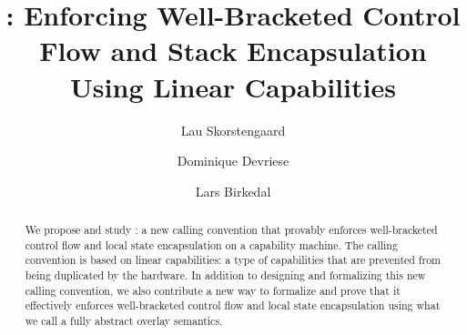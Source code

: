 \documentclass{jfp}
\begin{document}


\totalpg{\pageref{lastpage01}}

\title{\stktokens{}: Enforcing Well-Bracketed Control Flow and Stack Encapsulation Using Linear Capabilities}

\begin{authgrp}
  \author{Lau Skorstengaard}

  \author{Dominique Devriese}

  \author{Lars Birkedal}
\end{authgrp}

\begin{abstract}
  We propose and study \stktokens{}: a new calling convention that provably enforces well-bracketed control flow and local state encapsulation on a capability machine.
  The calling convention is based on linear capabilities: a type of capabilities that are prevented from being duplicated by the hardware.
  In addition to designing and formalizing this new calling convention, we also contribute a new way to formalize and prove that it effectively enforces well-bracketed control flow and local state encapsulation using what we call a fully abstract overlay semantics.
\end{abstract}




\maketitle[F]
\end{document}
